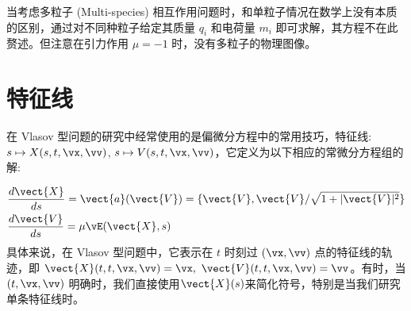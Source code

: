 当考虑多粒子 (Multi-species) 相互作用问题时，和单粒子情况在数学上没有本质的区别，通过对不同种粒子给定其质量 $q_i$ 和电荷量 $m_i$ 即可求解，其方程不在此赘述。但注意在引力作用 $\mu=-1$ 时，没有多粒子的物理图像。 





\section{特征线}
在 Vlasov 型问题的研究中经常使用的是偏微分方程中的常用技巧，特征线:$s \mapsto {X}(s, t, \vx,\vv)$, $s \mapsto {V}(s, t, \vx,\vv)$，它定义为以下相应的常微分方程组的解:


\begin{equation}\begin{aligned}
    &\frac{d \vect{X}}{d s}=\vect{a}(\vect{V})=\{\vect{V}, 
        \vect{V} / \sqrt{1+|\vect{V}|^{2}}\}\\
    &\frac{d \vect{V}}{d s}=\mu \vE(\vect{X}, s)
\end{aligned}\end{equation}
具体来说，在 Vlasov 型问题中，它表示在 $t$ 时刻过 $(\vx,\vv)$ 点的特征线的轨迹，即 $ \vect {X} (t, t, \vx, \vv) = \vx, ~ \vect{V} (t, t, \vx, \vv) = \vv$。有时，当 $(t,\vx,\vv)$ 明确时，我们直接使用$\vect{X}(s)$来简化符号，特别是当我们研究单条特征线时。

